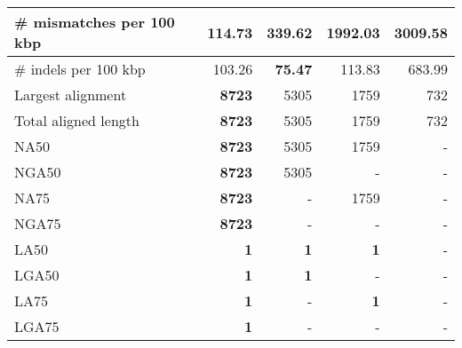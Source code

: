 \documentclass[12pt,a4paper]{article}
\begin{document}
\begin{table}[ht]
\begin{center}
\begin{tabular}{|l*{4}{|r}|}
\# mismatches per 100 kbp & {\bf 114.73} & 339.62 & 1992.03 & 3009.58 \\ \hline
\# indels per 100 kbp & 103.26 & {\bf 75.47} & 113.83 & 683.99 \\ \hline
Largest alignment & {\bf 8723} & 5305 & 1759 & 732 \\ \hline
Total aligned length & {\bf 8723} & 5305 & 1759 & 732 \\ \hline
NA50 & {\bf 8723} & 5305 & 1759 & - \\ \hline
NGA50 & {\bf 8723} & 5305 & - & - \\ \hline
NA75 & {\bf 8723} & - & 1759 & - \\ \hline
NGA75 & {\bf 8723} & - & - & - \\ \hline
LA50 & {\bf 1} & {\bf 1} & {\bf 1} & - \\ \hline
LGA50 & {\bf 1} & {\bf 1} & - & - \\ \hline
LA75 & {\bf 1} & - & {\bf 1} & - \\ \hline
LGA75 & {\bf 1} & - & - & - \\ \hline
\end{tabular}
\end{center}
\end{table}
\end{document}
